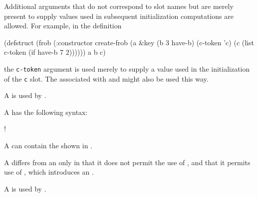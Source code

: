 Additional arguments that do not correspond to slot names but
are merely present to supply values used in subsequent initialization 
computations are allowed.
For example, in the definition

\code
 (defstruct (frob (:constructor create-frob
                  (a &key (b 3 have-b) (c-token 'c) 
                          (c (list c-token (if have-b 7 2))))))
         a b c)
\endcode
 
the {\tt c-token} argument is used merely to supply a value used in the 
initialization of the {\tt c} slot. The  
associated with  and 
might also be used this way.
 

\endsubsection%


A  is used by .

A  has the following syntax:

\Vskip 1pc!

A  can contain the  shown
in \thenextfigure.


A  differs from an  
only in that it does not permit the use of , 
and that it permits use of , 
     which introduces an .

\endsubSection%


A  is used by .

